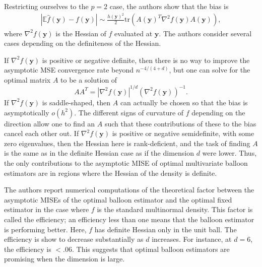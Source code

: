 \documentclass{article}
\newcommand{\E}{\mathbb{E}}
\newcommand{\abs}[1]{\left|#1\right|}
\begin{document}
Restricting ourselves to the $p=2$ case, the authors show that the bias is 
\begin{align}
    \abs{\E \hat{f}(\mathbf{y}) - f(\mathbf{y})} \sim \frac{h(\mathbf{y})^2}{2} \text{tr} \left(A(\mathbf{y})^T \nabla^2f(\mathbf{y}) A(\mathbf{y})\right), 
\end{align}
where $\nabla^2f(\mathbf{y})$ is the Hessian of $f$ evaluated at $\mathbf{y}$. The authors consider several cases depending on the definiteness of the Hessian.

If $\nabla^2f(\mathbf{y})$ is positive or negative definite, then there is no way to improve the asymptotic MSE convergence rate beyond $n^{-4/(4+d)}$, but one can solve for the optimal matrix $A$ to be a solution of 
\begin{equation}
    AA^T = \abs{\nabla^2 f(\mathbf{y})}^{1/d} (\nabla^2 f(\mathbf{y}))^{-1}. 
\end{equation}
If $\nabla^2f(\mathbf{y})$ is saddle-shaped, then $A$ can actually be chosen so that the bias is asymptotically $o(h^2)$. The different signs of curvature of $f$ depending on the direction allow one to find an $A$ such that these contributions of these to the bias cancel each other out. If $\nabla^2f(\mathbf{y})$ is positive or negative semidefinite, with some zero eigenvalues, then the Hessian here is rank-deficient, and the task of finding $A$ is the same as in the definite Hessian case as if the dimension $d$ were lower. Thus, the only contributions to the asymptotic MISE of optimal multivariate balloon estimators are in regions where the Hessian of the density is definite. 

The authors report numerical computations of the theoretical factor between the asymptotic MISEs of the optimal balloon estimator and the optimal fixed estimator in the case where $f$ is the standard multinormal density. This factor is called the efficiency; an efficiency less than one means that the balloon estimator is performing better. Here, $f$ has definite Hessian only in the unit ball. The efficiency is show to decrease substantially as $d$ increases. For instance, at $d=6$, the efficiency is $<.06$. This suggests that optimal balloon estimators are promising when the dimension is large. 
\end{document}
